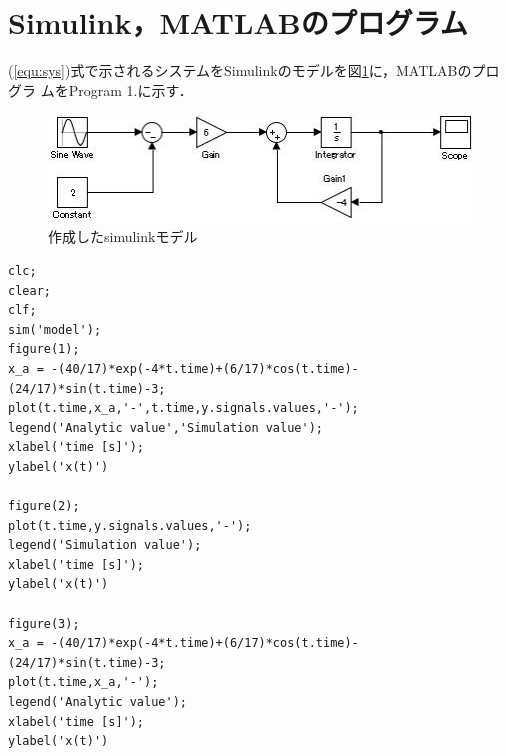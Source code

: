 \documentclass[a4paper,12pt]{jarticle}
\begin{document}
\section{Simulink，MATLABのプログラム}
(\ref{equ:sys})式で示されるシステムをSimulinkのモデルを図\ref{fig:model}に，MATLABのプログラ
ムをProgram 1.に示す．
%
\begin{figure}[hbp]
 \begin{center}
  \includegraphics[scale=.7,bb = 0 0 426 109]{fig/model.jpg}
 \end{center}
 \caption{作成したsimulinkモデル}
 \label{fig:model}
\end{figure}
%
\begin{lstlisting}[basicstyle=\ttfamily\footnotesize,frame=single,caption=作成したMATLABのプログラム]
clc;
clear;
clf;
sim('model');
figure(1);
x_a = -(40/17)*exp(-4*t.time)+(6/17)*cos(t.time)-(24/17)*sin(t.time)-3; 
plot(t.time,x_a,'-',t.time,y.signals.values,'-');
legend('Analytic value','Simulation value');
xlabel('time [s]');
ylabel('x(t)')

figure(2);
plot(t.time,y.signals.values,'-');
legend('Simulation value');
xlabel('time [s]');
ylabel('x(t)')

figure(3);
x_a = -(40/17)*exp(-4*t.time)+(6/17)*cos(t.time)-(24/17)*sin(t.time)-3; 
plot(t.time,x_a,'-');
legend('Analytic value');
xlabel('time [s]');
ylabel('x(t)')
\end{lstlisting}

\end{document}
